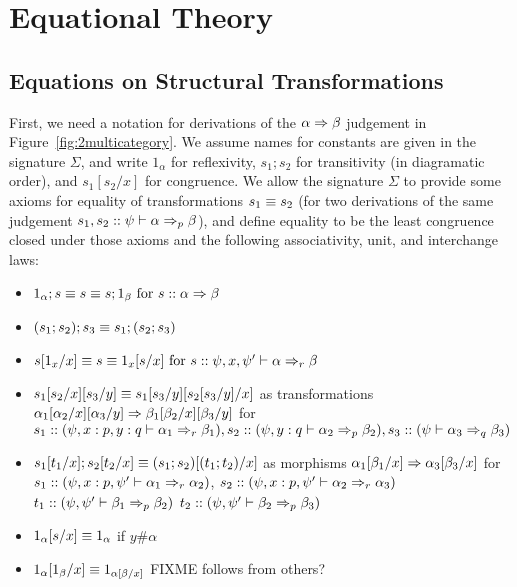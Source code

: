 \section{Equational Theory}
\label{sec:equational}

\subsection{Equations on Structural Transformations}
\label{sec:equational-transformations}

First, we need a notation for derivations of the $\alpha \spr \beta$
judgement in Figure~\ref{fig:2multicategory}.  We assume names for
constants are given in the signature $\Sigma$, and write $1_\alpha$ for
reflexivity, $s_1;s_2$ for transitivity (in diagramatic order), and
$s_1[s_2/x]$ for congruence.  We allow the signature $\Sigma$ to provide
some axioms for equality of transformations $s_1 \deq s_2$ (for two
derivations of the same judgement $s_1,s_2 ::
\wfsp{\psi}{\alpha}{\beta}{p}$), and define equality to be the least
congruence closed under those axioms and the following associativity,
unit, and interchange laws:

\begin{itemize}
\item $1_\alpha;s \deq s \deq s;1_\beta \text{ for } s :: \alpha \spr \beta$
\item $(s_1;s_2);s_3 \deq s_1;(s_2;s_3)$
\item $s[1_x/x] \deq s \deq 1_x[s/x] \text{ for } s :: \wfsp{\psi,x,\psi'}{\alpha}{\beta}{r}$
\item $\subst{\subst{s_1}{s_2}{x}}{s_3}{y} \deq
\subst{\subst{s_1}{s_3}{y}}{\subst{s_2}{s_3}{y}}{x}$ as transformations
${\subst{\subst{\alpha_1}{\alpha_2}{x}}{\alpha_3}{y}} \spr
{\subst{\subst{\beta_1}{\beta_2}{x}}{\beta_3}{y}}$ for $s_1 :: (\wfsp{\psi,x:p,y:q}{\alpha_1}{\beta_1}{r}), 
 s_2 :: (\wfsp{\psi,y:q}{\alpha_2}{\beta_2}{p}), 
 s_3 :: (\wfsp{\psi}{\alpha_3}{\beta_3}{q})$ 
\item $s_1[t_1/x];s_2[t_2/x] \deq (s_1;s_2)[(t_1;t_2)/x]$
as morphisms $\alpha_1[\beta_1/x] \spr \alpha_3[\beta_3/x]$
for $s_1 :: (\wfsp{\psi,x:p,\psi'}{\alpha_1}{\alpha_2}{r})$,
 $s_2 :: (\wfsp{\psi,x:p,\psi'}{\alpha_2}{\alpha_3}{r})$
 $t_1 :: (\wfsp{\psi,\psi'}{\beta_1}{\beta_2}{p})$
 $t_2 :: (\wfsp{\psi,\psi'}{\beta_2}{\beta_3}{p})$
\item $1_\alpha[s/x] \deq 1_\alpha$ if $y \# \alpha$
\item $\subst{1_\alpha}{1_\beta}{x} \deq 1_{\subst{\alpha}{\beta}{x}}$
  FIXME follows from others?
\end{itemize}

